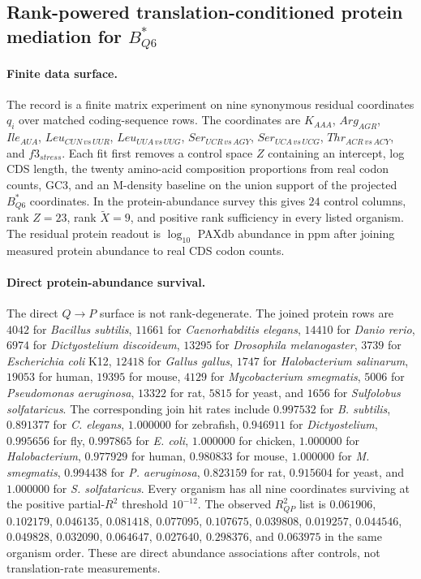\subsection{Rank-powered translation-conditioned protein mediation for $B^*_{Q6}$}\label{sec:q6-rank-powered-translation-conditioned-protein-mediation-cross-layer}

\paragraph{Finite data surface.}
The record is a finite matrix experiment on nine synonymous residual coordinates $q_i$ over matched coding-sequence rows.  The coordinates are $K_{AAA}$, $Arg_{AGR}$, $Ile_{AUA}$, $Leu_{CUN\,vs\,UUR}$, $Leu_{UUA\,vs\,UUG}$, $Ser_{UCR\,vs\,AGY}$, $Ser_{UCA\,vs\,UCG}$, $Thr_{ACR\,vs\,ACY}$, and $f3_{stress}$.  Each fit first removes a control space $Z$ containing an intercept, log CDS length, the twenty amino-acid composition proportions from real codon counts, GC3, and an M-density baseline on the union support of the projected $B^*_{Q6}$ coordinates.  In the protein-abundance survey this gives $24$ control columns, rank $Z=23$, rank $\widetilde X=9$, and positive rank sufficiency in every listed organism.  The residual protein readout is $\log_{10}$ PAXdb abundance in ppm after joining measured protein abundance to real CDS codon counts.

\paragraph{Direct protein-abundance survival.}
The direct $Q\to P$ surface is not rank-degenerate.  The joined protein rows are $4042$ for \emph{Bacillus subtilis}, $11661$ for \emph{Caenorhabditis elegans}, $14410$ for \emph{Danio rerio}, $6974$ for \emph{Dictyostelium discoideum}, $13295$ for \emph{Drosophila melanogaster}, $3739$ for \emph{Escherichia coli} K12, $12418$ for \emph{Gallus gallus}, $1747$ for \emph{Halobacterium salinarum}, $19053$ for human, $19395$ for mouse, $4129$ for \emph{Mycobacterium smegmatis}, $5006$ for \emph{Pseudomonas aeruginosa}, $13322$ for rat, $5815$ for yeast, and $1656$ for \emph{Sulfolobus solfataricus}.  The corresponding join hit rates include $0.997532$ for \emph{B. subtilis}, $0.891377$ for \emph{C. elegans}, $1.000000$ for zebrafish, $0.946911$ for \emph{Dictyostelium}, $0.995656$ for fly, $0.997865$ for \emph{E. coli}, $1.000000$ for chicken, $1.000000$ for \emph{Halobacterium}, $0.977929$ for human, $0.980833$ for mouse, $1.000000$ for \emph{M. smegmatis}, $0.994438$ for \emph{P. aeruginosa}, $0.823159$ for rat, $0.915604$ for yeast, and $1.000000$ for \emph{S. solfataricus}.  Every organism has all nine coordinates surviving at the positive partial-$R^2$ threshold $10^{-12}$.  The observed $R^2_{QP}$ list is $0.061906$, $0.102179$, $0.046135$, $0.081418$, $0.077095$, $0.107675$, $0.039808$, $0.019257$, $0.044546$, $0.049828$, $0.032090$, $0.064647$, $0.027640$, $0.298376$, and $0.063975$ in the same organism order.  These are direct abundance associations after controls, not translation-rate measurements.

